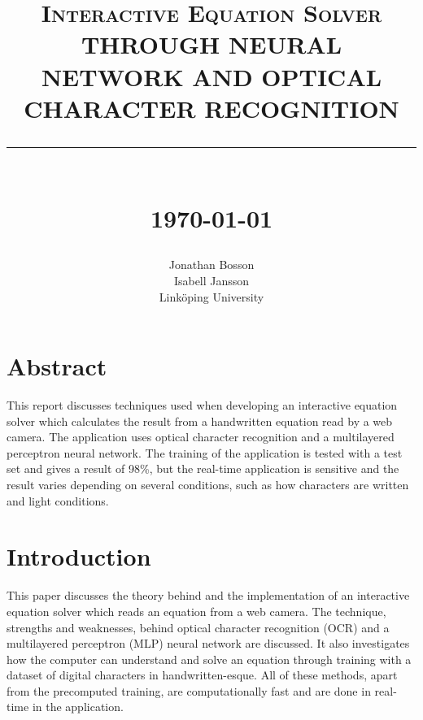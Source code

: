 \documentclass[12pt]{report}
\newcommand{\HRule}[1]{\rule{\linewidth}{#1}}
\begin{document}
\title{ \LARGE \textsc{Interactive Equation Solver}
		\\ [1.0cm]
		\normalsize \textbf{\uppercase{Through Neural Network and Optical Character Recognition}}
		\HRule{2pt} \\ [0.5cm]
		\normalsize \today \vspace*{5\baselineskip}}

\date{}

\author{
		Jonathan Bosson \\ 
		Isabell Jansson \\
		Link\"oping University }

\maketitle


\section*{Abstract}
This report discusses techniques used when developing an interactive equation solver which calculates the result from a handwritten equation read by a web camera. The application uses optical character recognition and a multilayered perceptron neural network. The training of the application is tested with a test set and gives a result of 98\%, but the real-time application is sensitive and the result varies depending on several conditions, such as how characters are written and light conditions.  
\newpage

\tableofcontents
\newpage

\sectionfont{\scshape}


\section*{Introduction}

This paper discusses the theory behind and the implementation of an interactive equation solver which reads an equation from a web camera. The technique, strengths and weaknesses, behind optical character recognition (OCR) and a multilayered perceptron (MLP) neural network are discussed. It also investigates how the computer can understand and solve an equation through training with a  dataset of digital characters in handwritten-esque. All of these methods, apart from the precomputed training, are computationally fast and are done in real-time in the application.
\end{document}
